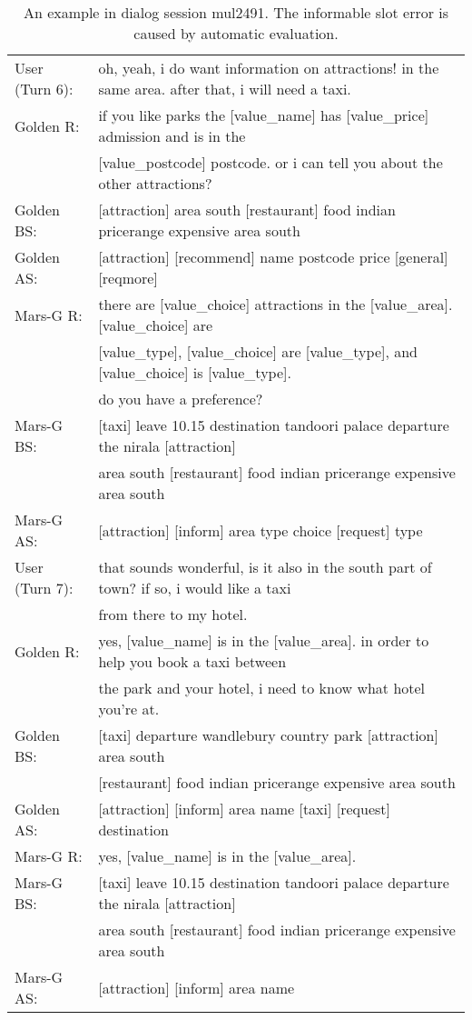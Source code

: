 \begin{table*}[ht]
{\begin{tabular}{ll}
  	\midrule
 User (Turn 6):  & oh, yeah, i do want information on attractions! in the same area. after that, i will need a taxi.	\\
  	Golden R: & if you like parks the [value\_name] has [value\_price] admission and is in the \\&[value\_postcode] postcode. or i can tell you about the other attractions? \\
  	Golden BS: &  [attraction] area south [restaurant] food indian pricerange expensive area south\\
Golden AS:&     [attraction] [recommend] name postcode price [general] [reqmore]  \\
  	  Mars-G R: & there are [value\_choice] attractions in the [value\_area]. [value\_choice] are \\&[value\_type], [value\_choice] are [value\_type], and [value\_choice] is [value\_type].\\& do you have a preference?\\
  	 Mars-G BS: & [taxi] leave 10.15 destination tandoori palace departure the nirala [attraction] \\&area south [restaurant] food indian pricerange expensive area south \\
  Mars-G AS:&  [attraction] [inform] area type choice [request] type    \\
           
  	 
  	 	\midrule
  	 	User (Turn 7):   &that sounds wonderful, is it also in the south part of town? {\color{red}if so, i would like a taxi}\\& {\color{red}from there to my hotel.}\\
  	 	  Golden R: & yes, [value\_name] is in the [value\_area]. in order to help you book a taxi between \\&the park and your hotel, i need to know what hotel you're at.\\
  	 	 	Golden BS:  & [taxi] departure wandlebury country park [attraction] area south \\&[restaurant] food indian pricerange expensive area south \\
  	 	 	Golden AS:&    [attraction] [inform] area name [taxi] [request] destination  \\
  	 	     Mars-G R: &{\color{red}yes, [value\_name] is in the [value\_area].}\\
  	 	 Mars-G BS:  &{\color{red}[taxi]} leave 10.15 destination tandoori palace departure the nirala [attraction] \\&area south [restaurant] food indian pricerange expensive area south \\
  Mars-G AS:&  [attraction] [inform] area name   \\
    
		\bottomrule
	\end{tabular}}\caption{An example in dialog session mul2491. The informable slot error is caused by automatic evaluation.\label{tab:case3}}
\end{table*}

